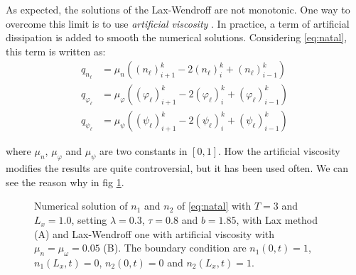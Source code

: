 As expected, the solutions of the Lax-Wendroff are not monotonic.
One way to overcome this limit is to use \textit{artificial viscosity}
\cite{vonneumann_method_1950,Biringen2011}. In practice, a term of
artificial dissipation is added to smooth the numerical solutions.
Considering \ref{eq:natal}, this term is written as:
\begin{align*}
q_{n_{\ell}} & =\mu_{n}\left(\left(n_{\ell}\right)_{i+1}^{k}-2\left(n_{\ell}\right)_{i}^{k}+\left(n_{\ell}\right)_{i-1}^{k}\right)\\
q_{\varphi_{\ell}} & =\mu_{\varphi}\left(\left(\varphi_{\ell}\right)_{i+1}^{k}-2\left(\varphi_{\ell}\right)_{i}^{k}+\left(\varphi_{\ell}\right)_{i-1}^{k}\right)\\
q_{\psi_{\ell}} & =\mu_{\psi}\left(\left(\psi_{\ell}\right)_{i+1}^{k}-2\left(\psi_{\ell}\right)_{i}^{k}+\left(\psi_{\ell}\right)_{i-1}^{k}\right)
\end{align*}

where $\mu_{n}$, $\mu_{\varphi}$ and $\mu_{\psi}$ are two constants
in $\left[0,1\right]$. How the artificial viscosity modifies the
results are quite controversial, but it has been used often. We can
see the reason why in fig \ref{fig:art_visc_example}.

\begin{figure}


\caption{\label{fig:art_visc_example}Numerical solution of $n_{1}$ and $n_{2}$
of \ref{eq:natal} with $T=3$ and $L_{x}=1.0$, setting $\lambda=0.3$,
$\tau=0.8$ and $b=1.85$, with Lax method (A) and Lax-Wendroff one
with artificial viscosity with $\mu_{n}=\mu_{\omega}=0.05$ (B). The
boundary condition are $n_{1}(0,t)=1$, $n_{1}(L_{x},t)=0$, $n_{2}(0,t)=0$
and $n_{2}(L_{x},t)=1$.}
\end{figure}

